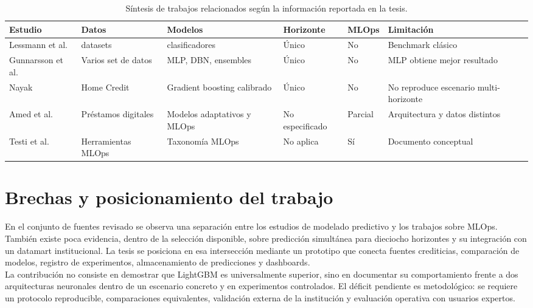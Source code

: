 \begin{table}[h!]
    \centering
    \small
    \begin{tabular}{
        | >{\raggedright\arraybackslash}p{2.0cm}
        | >{\raggedright\arraybackslash}p{2.5cm}
        | >{\raggedright\arraybackslash}p{2.5cm}
        | >{\raggedright\arraybackslash}p{2.0cm}
        | >{\centering\arraybackslash}p{1.5cm}
        | >{\raggedright\arraybackslash}p{3.0cm} |        
        }
        \hline
            \textbf{Estudio} & \textbf{Datos} & \textbf{Modelos} & \textbf{Horizonte} & \textbf{MLOps} & \textbf{Limitación} \\
        \hline
            Lessmann et al. \cite{lessmann2015benchmarking} &  8 datasets & 41 clasificadores & Único & No & Benchmark clásico \\
        \hline
            Gunnarsson et al. \cite{gunnarsson2021deep} & Varios set de datos & MLP, DBN, ensembles & Único & No & MLP obtiene mejor resultado \\
        \hline
            Nayak \cite{nayak2026calibrated} & Home Credit & Gradient boosting calibrado & Único & No & No reproduce escenario multi-horizonte \\
        \hline
            Amed et al. \cite{amed2025pdx} & Préstamos digitales & Modelos adaptativos y MLOps & No especificado & Parcial & Arquitectura y datos distintos \\
        \hline
            Testi et al. \cite{testi2022mlops} & Herramientas MLOps & Taxonomía MLOps & No aplica & Sí & Documento conceptual \\
        \hline
    \end{tabular}
    \caption{Síntesis de trabajos relacionados según la información reportada en la tesis.}
    \label{tab:sintesis_literatura}
\end{table}

\section{Brechas y posicionamiento del trabajo}

En el conjunto de fuentes revisado se observa una separación entre los estudios de modelado predictivo y los trabajos sobre MLOps. También existe poca evidencia, dentro de la selección disponible, sobre predicción simultánea para dieciocho horizontes y su integración con un datamart institucional. La tesis se posiciona en esa intersección mediante un prototipo que conecta fuentes crediticias, comparación de modelos, registro de experimentos, almacenamiento de predicciones y dashboards.\\

La contribución no consiste en demostrar que LightGBM es universalmente superior, sino en documentar su comportamiento frente a dos arquitecturas neuronales dentro de un escenario concreto y en experimentos controlados. El déficit pendiente es metodológico: se requiere un protocolo reproducible, comparaciones equivalentes, validación externa de la institución y evaluación operativa con usuarios expertos.
